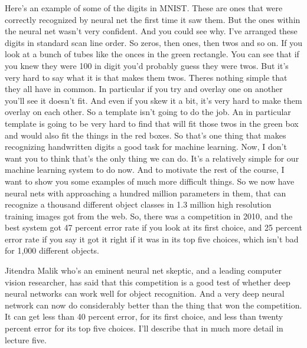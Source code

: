 \begin{multicols}{2}
\begin{footnotesize}
Here's an example of some of the digits in MNIST. These are ones that were correctly recognized by neural net the first time it saw them. But the ones within the neural net wasn't very confident. And you could see why. I've arranged these digits in standard scan line order. So zeros, then ones, then twos and so on. If you look at a bunch of tubes like the onces in the green rectangle. You can see that if you knew they were 100 in digit you'd probably guess they were twos. But it's very hard to say what it is that makes them twos. Theres nothing simple that they all have in common. In particular if you try and overlay one on another you'll see it doesn't fit. And even if you skew it a bit, it's very hard to make them overlay on each other. So a template isn't going to do the job. An in particular template is going to be very hard to find that will fit those twos in the green box and would also fit the things in the red boxes. So that's one thing that makes recognizing handwritten digits a good task for machine learning. Now, I don't want you to think that's the only thing we can do. It's a relatively simple for our machine learning system to do now. And to motivate the rest of the course, I want to show you some examples of much more difficult things. So we now have neural nets with approaching a hundred million parameters in them, that can recognize a thousand different object classes in 1.3 million high resolution training images got from the web. So, there was a competition in 2010, and the best system got 47 percent error rate if you look at its first choice, and 25 percent error rate if you say it got it right if it was in its top five choices, which isn't bad for 1,000 different objects.

Jitendra Malik who's an eminent neural net skeptic, and a leading computer vision researcher, has said that this competition is a good test of whether deep neural networks can work well for object recognition. And a very deep neural network can now do considerably better than the thing that won the competition. It can get less than 40 percent error, for its first choice, and less than twenty percent error for its top five choices. I'll describe that in much more detail in lecture five.


\end{footnotesize}
\end{multicols}
